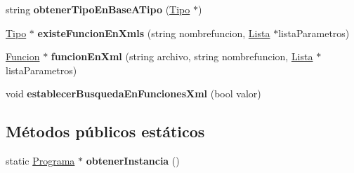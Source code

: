 \begin{DoxyCompactItemize}
\item 
\hypertarget{class_programa_a0c0aea1656ca1edd5fba74b84609707c}{string {\bfseries obtener\-Tipo\-En\-Base\-A\-Tipo} (\hyperlink{class_tipo}{Tipo} $\ast$)}\label{class_programa_a0c0aea1656ca1edd5fba74b84609707c}

\item 
\hypertarget{class_programa_aa5550553e602a07d51c2a9fec74f4f4b}{\hyperlink{class_tipo}{Tipo} $\ast$ {\bfseries existe\-Funcion\-En\-Xmls} (string nombrefuncion, \hyperlink{class_lista}{Lista} $\ast$lista\-Parametros)}\label{class_programa_aa5550553e602a07d51c2a9fec74f4f4b}

\item 
\hypertarget{class_programa_a4e792f56d7ed9166d9fdcfcf95849947}{\hyperlink{class_funcion}{Funcion} $\ast$ {\bfseries funcion\-En\-Xml} (string archivo, string nombrefuncion, \hyperlink{class_lista}{Lista} $\ast$lista\-Parametros)}\label{class_programa_a4e792f56d7ed9166d9fdcfcf95849947}

\item 
\hypertarget{class_programa_aa090190588727c1ed4679249adf87080}{void {\bfseries establecer\-Busqueda\-En\-Funciones\-Xml} (bool valor)}\label{class_programa_aa090190588727c1ed4679249adf87080}

\end{DoxyCompactItemize}
\subsection*{Métodos públicos estáticos}
\begin{DoxyCompactItemize}
\item 
\hypertarget{class_programa_a7d298fe20901dc1389410cbff0781aee}{static \hyperlink{class_programa}{Programa} $\ast$ {\bfseries obtener\-Instancia} ()}\label{class_programa_a7d298fe20901dc1389410cbff0781aee}

\end{DoxyCompactItemize}
